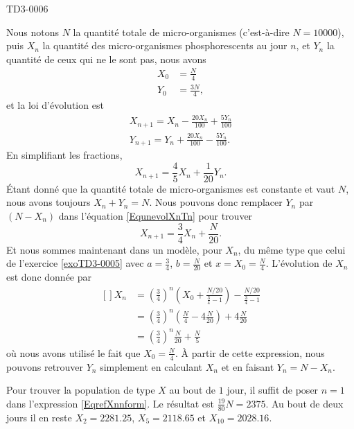 
\begin{corrige}{TD3-0006}

	Nous notons $N$ la quantité totale de micro-organismes (c'est-à-dire $N=10000$), puis $X_n$ la quantité des micro-organismes phosphorescents au jour $n$, et $Y_n$ la quantité de ceux qui ne le sont pas, nous avons
	\begin{subequations}
		\begin{align}
			X_0&=\frac{N}{ 4 }\\
			Y_0&=\frac{ 3N }{ 4 },
		\end{align}
	\end{subequations}
	et la loi d'évolution est
	\begin{subequations}
		\begin{align}
			X_{n+1}=X_n-\frac{ 20 X_n }{ 100 }+\frac{ 5Y_n }{ 100 }\\
			Y_{n+1}=Y_n+\frac{ 20 X_n }{ 100 }-\frac{ 5Y_n }{ 100 }.
		\end{align}
	\end{subequations}
	En simplifiant les fractions,
	\begin{equation}		\label{EqunevolXnTn}
		X_{n+1}=\frac{ 4 }{ 5 }X_n+\frac{1}{ 20 }Y_n.
	\end{equation}
	Étant donné que la quantité totale de micro-organismes est constante et vaut $N$, nous avons toujours $X_n+Y_n=N$. Nous pouvons donc remplacer $Y_n$ par $(N-X_n)$ dans l'équation \eqref{EqunevolXnTn} pour trouver 
	\begin{equation}
		X_{n+1}=\frac{ 3 }{ 4 }X_n+\frac{ N }{ 20 }.
	\end{equation}
	Et nous sommes maintenant dans un modèle, pour $X_n$, du même type que celui de l'exercice \ref{exoTD3-0005} avec $a=\frac{ 3 }{ 4 }$, $b=\frac{ N }{ 20 }$ et $x=X_0=\frac{ N }{ 4 }$. L'évolution de $X_n$ est donc donnée par
	\begin{equation}		\label{EqrefXnnform}
		\begin{aligned}[]
			X_n&=\left( \frac{ 3 }{ 4 } \right)^n\left( X_0+\frac{ N/20 }{ \frac{ 3 }{ 4 }-1 } \right)-\frac{ N/20 }{ \frac{ 3 }{ 4 }-1 }\\
			&=\left( \frac{ 3 }{ 4 } \right)^n\left( \frac{ N }{ 4 }-4\frac{ N }{ 20 } \right)+4\frac{ N }{ 20 }\\
			&=\left( \frac{ 3 }{ 4 } \right)^n\frac{ N }{ 20 }+\frac{ N }{ 5 }
		\end{aligned}
	\end{equation}
	où nous avons utilisé le fait que $X_0=\frac{ N }{ 4 }$. À partir de cette expression, nous pouvons retrouver $Y_n$ simplement en calculant $X_n$ et en faisant $Y_n=N-X_n$.

	Pour trouver la population de type $X$ au bout de $1$ jour, il suffit de poser $n=1$ dans l'expression \eqref{EqrefXnnform}. Le résultat est $\frac{ 19 }{ 80 }N=2375$. Au bout de deux jours il en reste $X_2=2281.25$, $X_5=2118.65$ et $X_10=2028.16$.


\end{corrige}
